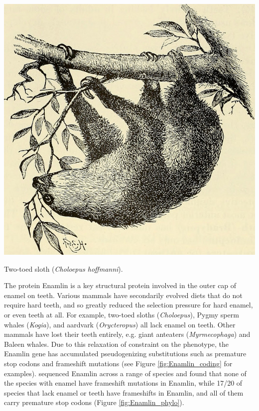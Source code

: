 \begin{marginfigure}
\begin{center}
\includegraphics[width=\textwidth]{illustration_images/Genetic_drift/sloth/20423856040_6e4360df9c_z.jpg}   %
\end{center}
\caption{Two-toed sloth ({\it Choloepus hoffmanni}).  } \label{fig:sloth}
\end{marginfigure}

The protein Enamlin is a key structural protein involved in the outer cap of enamel on teeth. Various mammals have secondarily evolved diets that do not require hard teeth, and so greatly reduced the selection pressure for hard enamel, or even teeth at all. For example, two-toed sloths ({\it Choloepus}), Pygmy sperm whales ({\it Kogia}), and aardvark ({\it Orycteropus}) all lack  enamel on teeth.
Other mammals have lost their teeth entirely, e.g. giant anteaters ({\it Myrmecophaga}) and Baleen whales. Due to this relaxation of constraint on the phenotype, the Enamlin gene has accumulated pseudogenizing substitutions such as premature stop codons and frameshift mutations (see Figure \ref{fig:Enamlin_coding}
for examples).  \citeauthor{Meredith:09} sequenced Enamlin across a
range of species and found that none of the species with enamel have frameshift
mutations in Enamlin, while 17/20 of species that lack enamel or teeth have
frameshifts in Enamlin, and all of them carry premature stop codons
(Figure \ref{fig:Enamlin_phylo}).

